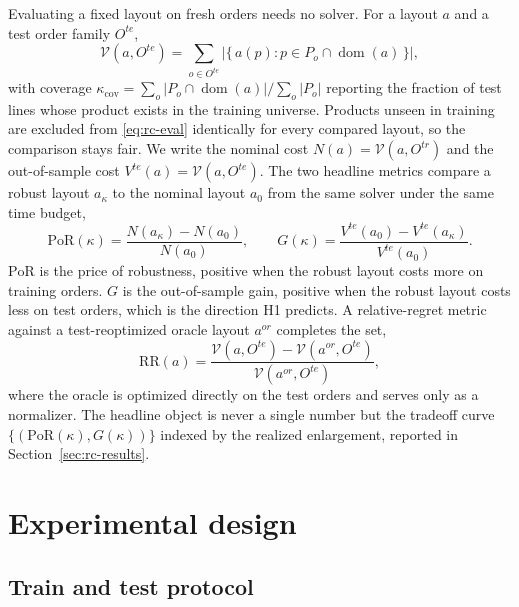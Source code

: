 \documentclass[preprint,review,11pt,authoryear]{elsarticle}
\begin{document}
Evaluating a fixed layout on fresh orders needs no solver. For a layout $a$ and a test order family $O^{te}$,
\begin{equation}
\mathcal V(a, O^{te}) = \sum_{o \in O^{te}} \big|\{\, a(p) : p \in P_o \cap \operatorname{dom}(a) \,\}\big|,
\label{eq:rc-eval}
\end{equation}
with coverage $\kappa_{\text{cov}} = \sum_o |P_o \cap \operatorname{dom}(a)| / \sum_o |P_o|$ reporting the fraction of test lines whose product exists in the training universe. Products unseen in training are excluded from \eqref{eq:rc-eval} identically for every compared layout, so the comparison stays fair. We write the nominal cost $N(a) = \mathcal V(a, O^{tr})$ and the out-of-sample cost $V^{te}(a) = \mathcal V(a, O^{te})$. The two headline metrics compare a robust layout $a_\kappa$ to the nominal layout $a_0$ from the same solver under the same time budget,
\begin{equation}
\mathrm{PoR}(\kappa) = \frac{N(a_\kappa) - N(a_0)}{N(a_0)},
\qquad
G(\kappa) = \frac{V^{te}(a_0) - V^{te}(a_\kappa)}{V^{te}(a_0)}.
\label{eq:rc-por-g}
\end{equation}
$\mathrm{PoR}$ is the price of robustness, positive when the robust layout costs more on training orders. $G$ is the out-of-sample gain, positive when the robust layout costs less on test orders, which is the direction H1 predicts. A relative-regret metric against a test-reoptimized oracle layout $a^{or}$ completes the set,
\begin{equation}
\mathrm{RR}(a) = \frac{\mathcal V(a, O^{te}) - \mathcal V(a^{or}, O^{te})}{\mathcal V(a^{or}, O^{te})},
\label{eq:rc-rr}
\end{equation}
where the oracle is optimized directly on the test orders and serves only as a normalizer. The headline object is never a single number but the tradeoff curve $\{(\mathrm{PoR}(\kappa), G(\kappa))\}$ indexed by the realized enlargement, reported in Section~\ref{sec:rc-results}.

\section{Experimental design}\label{sec:rc-design}

\subsection{Train and test protocol}\label{sec:rc-protocol}
\end{document}
